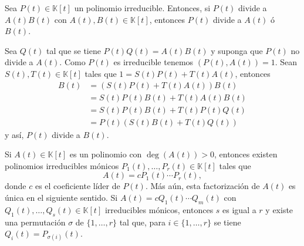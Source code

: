 \begin{lema}
Sea $P(t)\in \mathbb{K}[t]$ un polinomio irreducible. Entonces, si $P(t)$ divide a $A(t)B(t)$ con $A(t),B(t)\in \mathbb{K}[t]$, entonces $P(t)$ divide a $A(t)$ \'o $B(t)$.
\end{lema}

\dem Sea $Q(t)$ tal que se tiene $P(t)Q(t)=A(t)B(t)$ y suponga que $P(t)$ no divide a $A(t)$. Como $P(t)$ es irreducible tenemos $\left(P(t),A(t)\right)=1$. Sean $S(t),T(t)\in \mathbb{K}[t]$ tales que $1=S(t)P(t)+T(t)A(t)$, entonces
\begin{align*}
B(t) & =(S(t)P(t)+T(t)A(t))B(t)\\
& =S(t)P(t)B(t)+T(t)A(t)B(t)\\
& =S(t)P(t)B(t)+T(t)P(t)Q(t)\\
& =P(t)\left(S(t)B(t)+T(t)Q(t)\right)
\end{align*}
y así, $P(t)$ divide a $B(t)$.

\begin{teo}\label{factorizacionunica}
Si $A(t)\in \mathbb{K}[t]$ es un polinomio con $\deg(A(t))>0$, entonces existen polinomios irreducibles mónicos $P_1(t),\ldots,P_r(t)\in \mathbb{K}[t]$ tales que
$$A(t)=cP_1(t)\cdots P_r(t),$$
donde $c$ es el coeficiente líder de $P(t)$. Más aún, esta factorización de $A(t)$ es única en el siguiente sentido. Si $A(t)=cQ_1(t)\cdots Q_m(t)$ con $Q_1(t),\ldots,Q_s(t)\in \mathbb{K}[t]$ irreducibles mónicos, entonces $s$ es igual a $r$ y existe una permutación $\sigma$ de $\{1,\ldots,r\}$ tal que, para $i\in\{1,\ldots,r\}$ se tiene $Q_i(t)=P_{\sigma(i)}(t)$.
\end{teo}

